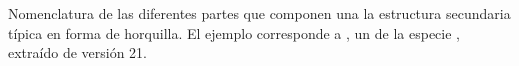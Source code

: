 \label{fig:hairpin-parts} Nomenclatura de las diferentes partes que
componen una la estructura secundaria típica en forma de horquilla.
El ejemplo corresponde a \protect{}, un \premirna{} de la
especie , extraído de \work\mirbase{} versión 21.

